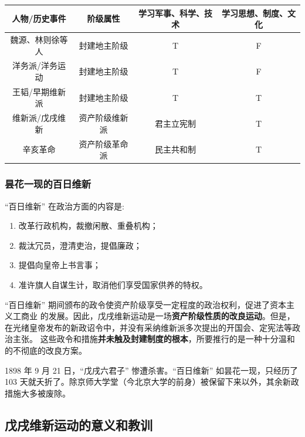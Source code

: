 \documentclass[10pt, UTF8]{book} %
\begin{document}
\begin{mdframed}[frametitle={救亡图存的各种尝试}]
    \begin{table}[H]
        \centering
        \begin{tabular}{c c c c}
            \toprule
            人物/历史事件 & 阶级属性 & 学习军事、科学、技术 & 学习思想、制度、文化 \\
            \midrule
            魏源、林则徐等人 & 封建地主阶级 & T & F \\
            洋务派/洋务运动 & 封建地主阶级 & T & F \\
            王韬/早期维新派 & 封建地主阶级 & T & T \\
            维新派/戊戌维新 & 资产阶级维新派 & 君主立宪制 & T \\
            辛亥革命 & 资产阶级革命派 & 民主共和制 & T \\
            \bottomrule
        \end{tabular}        
    \end{table}
\end{mdframed}

\subsubsection{昙花一现的百日维新}


“百日维新” 在政治方面的内容是:
\begin{enumerate}[label=(\arabic*), itemsep=0pt]
    \item 改革行政机构，裁撤闲散、重叠机构；
    \item 裁汰冗员，澄清吏治，提倡廉政；
    \item 提倡向皇帝上书言事；
    \item 准许旗人自谋生计，取消他们享受国家供养的特权。
\end{enumerate}
“百日维新” 期间颁布的政令使资产阶级享受一定程度的政治权利，促进了资本主义工商业
的发展。因此，戊戌维新运动是一场\textbf{资产阶级性质的改良运动}。但是，
在光绪皇帝发布的新政诏令中，并没有采纳维新派多次提出的开国会、定宪法等政治主张。
这些政令和措施\textbf{并未触及封建制度的根本}，所要推行的是一种十分温和的不彻底的改良方案。

1898 年 9 月 21 日，“戊戌六君子” 惨遭杀害。“百日维新” 如昙花一现，只经历了
103 天就夭折了。除京师大学堂（今北京大学的前身）被保留下来以外，其余新政措施大多被废除。

\subsection{戊戌维新运动的意义和教训}
\end{document}
